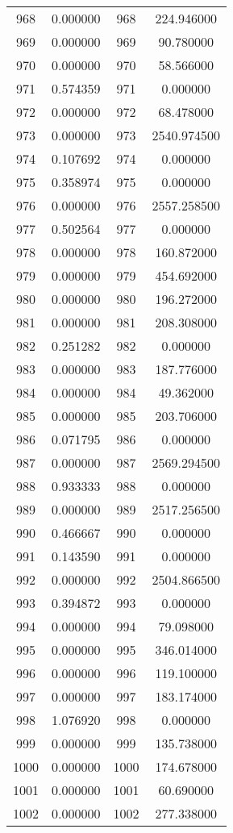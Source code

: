 \documentclass[12pt]{article}
\begin{document}
\begin{longtable}{@{}cccc@{}}
968 & 0.000000 & 968 & 224.946000 \\
969 & 0.000000 & 969 & 90.780000 \\
970 & 0.000000 & 970 & 58.566000 \\
971 & 0.574359 & 971 & 0.000000 \\
972 & 0.000000 & 972 & 68.478000 \\
973 & 0.000000 & 973 & 2540.974500 \\
974 & 0.107692 & 974 & 0.000000 \\
975 & 0.358974 & 975 & 0.000000 \\
976 & 0.000000 & 976 & 2557.258500 \\
977 & 0.502564 & 977 & 0.000000 \\
978 & 0.000000 & 978 & 160.872000 \\
979 & 0.000000 & 979 & 454.692000 \\
980 & 0.000000 & 980 & 196.272000 \\
981 & 0.000000 & 981 & 208.308000 \\
982 & 0.251282 & 982 & 0.000000 \\
983 & 0.000000 & 983 & 187.776000 \\
984 & 0.000000 & 984 & 49.362000 \\
985 & 0.000000 & 985 & 203.706000 \\
986 & 0.071795 & 986 & 0.000000 \\
987 & 0.000000 & 987 & 2569.294500 \\
988 & 0.933333 & 988 & 0.000000 \\
989 & 0.000000 & 989 & 2517.256500 \\
990 & 0.466667 & 990 & 0.000000 \\
991 & 0.143590 & 991 & 0.000000 \\
992 & 0.000000 & 992 & 2504.866500 \\
993 & 0.394872 & 993 & 0.000000 \\
994 & 0.000000 & 994 & 79.098000 \\
995 & 0.000000 & 995 & 346.014000 \\
996 & 0.000000 & 996 & 119.100000 \\
997 & 0.000000 & 997 & 183.174000 \\
998 & 1.076920 & 998 & 0.000000 \\
999 & 0.000000 & 999 & 135.738000 \\
1000 & 0.000000 & 1000 & 174.678000 \\
1001 & 0.000000 & 1001 & 60.690000 \\
1002 & 0.000000 & 1002 & 277.338000 \\

\end{longtable}
\end{document}
